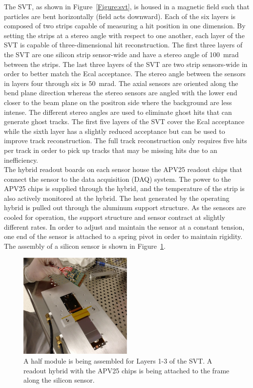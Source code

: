 The SVT, as shown in Figure~\ref{Figure:svt}, is housed in a magnetic field such that particles are bent horizontally (field acts downward). Each of the six layers is composed of two strips capable of measuring a hit position in one dimension. By setting the strips at a stereo angle with respect to one another, each layer of the SVT is capable of three-dimensional hit reconstruction. The first three layers of the SVT are one silicon strip sensor-wide and have a stereo angle of 100~mrad between the strips. The last three layers of the SVT are two strip sensors-wide in order to better match the Ecal acceptance. The stereo angle between the sensors in layers four through six is 50~mrad. The axial sensors are oriented along the bend plane direction whereas the stereo sensors are angled with the lower end closer to the beam plane on the positron side where the background are less intense. The different stereo angles are used to eliminate ghost hits that can generate ghost tracks. The first five layers of the SVT cover the Ecal acceptance while the sixth layer has a slightly reduced acceptance but can be used to improve track reconstruction. The full track reconstruction only requires five hits per track in order to pick up tracks that may be missing hits due to an inefficiency. \\
\indent The hybrid readout boards on each sensor house the APV25 readout chips that connect the sensor to the data acquisition (DAQ) system. The power to the APV25 chips is supplied through the hybrid, and the temperature of the strip is also actively monitored at the hybrid. The heat generated by the operating hybrid is pulled out through the aluminum support structure. As the sensors are cooled for operation, the support structure and sensor contract at slightly different rates. In order to adjust and maintain the sensor at a constant tension, one end of the sensor is attached to a spring pivot in order to maintain rigidity. The assembly of a silicon sensor is shown in Figure~\ref{Figure:svtAssembly}.
\begin{figure}[H]
  \centering
      \includegraphics[width=0.5\textwidth]{pics/experiment/svtSensorAssembly.png}
  \caption[Assembly of a half module of the SVT ]{A half module is being assembled for Layers 1-3 of the SVT. A readout hybrid with the APV25 chips is being attached to the frame along the silicon sensor.~\cite{Proposal}}
  \label{Figure:svtAssembly}
\end{figure}
